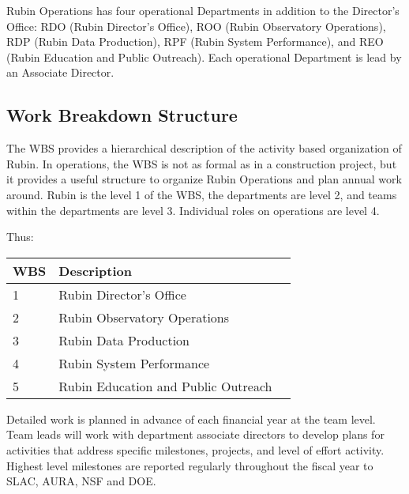 Rubin Operations has four operational Departments in addition to the Director’s Office: RDO (Rubin Director’s Office), ROO (Rubin Observatory Operations), RDP (Rubin Data Production), RPF (Rubin System Performance), and REO (Rubin Education and Public Outreach). 
Each operational Department is lead by an Associate Director.

\subsection{Work Breakdown Structure}
\label{sec:wbs}

The \gls{WBS} provides a hierarchical description of the activity based organization of Rubin. 
In operations, the WBS is not as formal as in a construction project, but it provides a useful structure to organize Rubin Operations and plan annual work around. 
Rubin is the level 1 of the WBS, the departments are level 2, and teams within the departments are level 3. 
Individual roles on operations are level 4.   

Thus:

\begin{longtable}[]{@{}lll@{}}
\hline
\gls{WBS} & Description \tabularnewline
\hline
\endhead

1 & Rubin Director's Office  \tabularnewline
2 & Rubin Observatory Operations  \tabularnewline
3 & Rubin Data Production \tabularnewline
4 & Rubin System Performance  \tabularnewline
5 & Rubin Education and Public Outreach \tabularnewline

\hline
\end{longtable}


Detailed work is planned in advance of each financial year at the team level. 
Team leads will work with department associate directors to develop plans for activities that address specific milestones, projects, and level of effort activity. 
Highest level milestones are reported regularly throughout the fiscal year to SLAC, AURA, NSF and DOE. 


